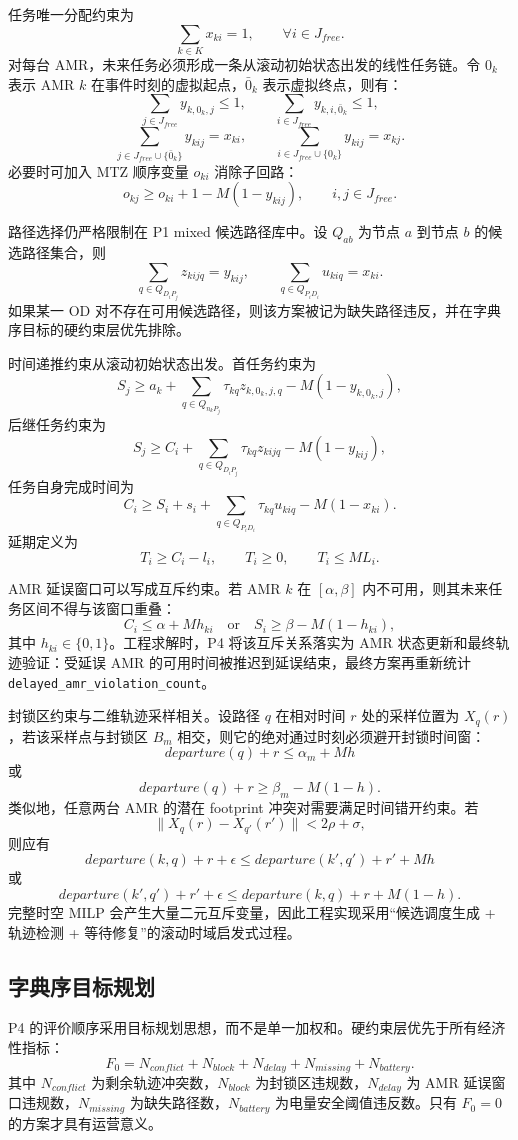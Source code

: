 任务唯一分配约束为
\[
\sum_{k\in K}x_{ki}=1,\qquad \forall i\in J_{free}.
\]
对每台 AMR，未来任务必须形成一条从滚动初始状态出发的线性任务链。令 $0_k$ 表示 AMR $k$ 在事件时刻的虚拟起点，$\bar 0_k$ 表示虚拟终点，则有：
\[
\sum_{j\in J_{free}}y_{k,0_k,j}\le 1,\qquad
\sum_{i\in J_{free}}y_{k,i,\bar 0_k}\le 1,
\]
\[
\sum_{j\in J_{free}\cup\{\bar 0_k\}}y_{kij}=x_{ki},\qquad
\sum_{i\in J_{free}\cup\{0_k\}}y_{kij}=x_{kj}.
\]
必要时可加入 MTZ 顺序变量 $o_{ki}$ 消除子回路：
\[
o_{kj}\ge o_{ki}+1-M(1-y_{kij}),\qquad i,j\in J_{free}.
\]

路径选择仍严格限制在 P1 mixed 候选路径库中。设 $Q_{ab}$ 为节点 $a$ 到节点 $b$ 的候选路径集合，则
\[
\sum_{q\in Q_{D_iP_j}}z_{kijq}=y_{kij},\qquad
\sum_{q\in Q_{P_iD_i}}u_{kiq}=x_{ki}.
\]
如果某一 OD 对不存在可用候选路径，则该方案被记为缺失路径违反，并在字典序目标的硬约束层优先排除。

时间递推约束从滚动初始状态出发。首任务约束为
\[
S_j\ge a_k+\sum_{q\in Q_{n_kP_j}}\tau_{kq}z_{k,0_k,j,q}
-M(1-y_{k,0_k,j}),
\]
后继任务约束为
\[
S_j\ge C_i+\sum_{q\in Q_{D_iP_j}}\tau_{kq}z_{kijq}
-M(1-y_{kij}),
\]
任务自身完成时间为
\[
C_i\ge S_i+s_i+\sum_{q\in Q_{P_iD_i}}\tau_{kq}u_{kiq}-M(1-x_{ki}).
\]
延期定义为
\[
T_i\ge C_i-l_i,\qquad T_i\ge 0,\qquad T_i\le M L_i.
\]

AMR 延误窗口可以写成互斥约束。若 AMR $k$ 在 $[\alpha,\beta]$ 内不可用，则其未来任务区间不得与该窗口重叠：
\[
C_i\le \alpha+Mh_{ki}\quad \text{or}\quad S_i\ge \beta-M(1-h_{ki}),
\]
其中 $h_{ki}\in\{0,1\}$。工程求解时，P4 将该互斥关系落实为 AMR 状态更新和最终轨迹验证：受延误 AMR 的可用时间被推迟到延误结束，最终方案再重新统计 \verb|delayed_amr_violation_count|。

封锁区约束与二维轨迹采样相关。设路径 $q$ 在相对时间 $r$ 处的采样位置为 $X_q(r)$，若该采样点与封锁区 $B_m$ 相交，则它的绝对通过时刻必须避开封锁时间窗：
\[
departure(q)+r\le \alpha_m+Mh
\]
或
\[
departure(q)+r\ge \beta_m-M(1-h).
\]
类似地，任意两台 AMR 的潜在 footprint 冲突对需要满足时间错开约束。若
\[
\|X_q(r)-X_{q'}(r')\|<2\rho+\sigma,
\]
则应有
\[
departure(k,q)+r+\epsilon\le departure(k',q')+r'+Mh
\]
或
\[
departure(k',q')+r'+\epsilon\le departure(k,q)+r+M(1-h).
\]
完整时空 MILP 会产生大量二元互斥变量，因此工程实现采用“候选调度生成 + 轨迹检测 + 等待修复”的滚动时域启发式过程。

\subsection{字典序目标规划}

P4 的评价顺序采用目标规划思想，而不是单一加权和。硬约束层优先于所有经济性指标：
\[
F_0=
N_{conflict}+N_{block}+N_{delay}+N_{missing}+N_{battery}.
\]
其中 $N_{conflict}$ 为剩余轨迹冲突数，$N_{block}$ 为封锁区违规数，$N_{delay}$ 为 AMR 延误窗口违规数，$N_{missing}$ 为缺失路径数，$N_{battery}$ 为电量安全阈值违反数。只有 $F_0=0$ 的方案才具有运营意义。

